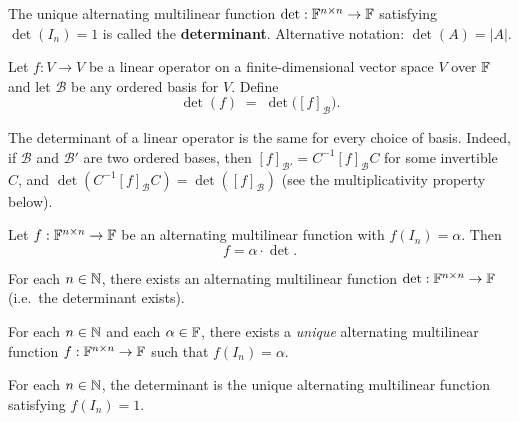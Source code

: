\begin{defbox}
\label{def:determinant}
The unique alternating multilinear function
$\det:\mathbb{F}^{n\times n}\to\mathbb{F}$ satisfying $\det(I_n)=1$ is called the
\textbf{determinant}.  Alternative notation: $\det(A)=|A|$.
\end{defbox}

\begin{defbox}
\label{def:det-lt}
Let $f:V\to V$ be a linear operator on a finite-dimensional vector space
$V$ over $\mathbb{F}$ and let $\mathcal{B}$ be any ordered basis for $V$.
Define
\[
    \det(f) \;=\; \det\bigl([f]_{\mathcal{B}}\bigr).
\]
\end{defbox}

\begin{tipbox}
The determinant of a linear operator is the same for every choice of
basis.  Indeed, if $\mathcal{B}$ and $\mathcal{B}'$ are two ordered bases,
then $[f]_{\mathcal{B}'}=C^{-1}[f]_{\mathcal{B}}C$ for some invertible $C$,
and $\det(C^{-1}[f]_{\mathcal{B}}C)=\det([f]_{\mathcal{B}})$ (see the
multiplicativity property below).
\end{tipbox}

\begin{propbox}
\label{prop:alt-mult-det}
Let $f:\mathbb{F}^{n\times n}\to\mathbb{F}$ be an alternating multilinear function with
$f(I_n)=\alpha$.  Then
\[
    f = \alpha\cdot\det.
\]
\end{propbox}

\begin{corbox}
For each $n\in\mathbb{N}$, there exists an alternating multilinear function
$\det:\mathbb{F}^{n\times n}\to\mathbb{F}$ (i.e.\ the determinant exists).
\end{corbox}

\begin{thmbox}
\label{thm:unique-alt-mult}
For each $n\in\mathbb{N}$ and each $\alpha\in\mathbb{F}$, there exists a \emph{unique}
alternating multilinear function $f:\mathbb{F}^{n\times n}\to\mathbb{F}$ such that
$f(I_n)=\alpha$.
\end{thmbox}

\begin{corbox}
For each $n\in\mathbb{N}$, the determinant is the unique alternating multilinear
function satisfying $f(I_n)=1$.
\end{corbox}

